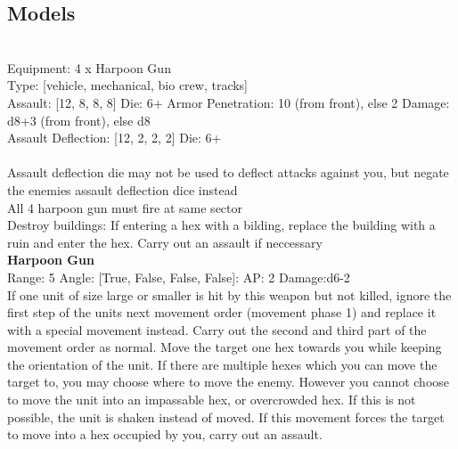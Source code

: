 \subsection{ Models }

 \\
Equipment: 4 x Harpoon Gun \\
Type: [vehicle, mechanical, bio crew, tracks] \\

Assault: [12, 8, 8, 8] Die: 6+ Armor Penetration: 10 (from front), else 2 Damage: d8+3 (from front), else d8 \\
Assault Deflection: [12, 2, 2, 2] Die: 6+\\
\\ 
Assault deflection die may not be used to deflect attacks against you, but negate the enemies assault deflection dice instead\\ 
 

All 4 harpoon gun must fire at same sector\\ 
Destroy buildings: If entering a hex with a bilding, replace the building with a ruin and enter the hex. Carry out an assault if neccessary\\ 


{\bf Harpoon Gun } \\



Range: 5  Angle: [True, False, False, False]: AP: 2 Damage:d6-2 \\
If one unit of size large or smaller is hit by this weapon but not killed, ignore the first step of the units next movement order (movement phase 1) and replace it with a special movement instead. Carry out the second and third part of the movement order as normal. Move the target one hex towards you while keeping the orientation of the unit. If there are multiple hexes which you can move the target to, you may choose where to move the enemy. However you cannot choose to move the unit into an impassable hex, or overcrowded hex. If this is not possible, the unit is shaken instead of moved. If this movement forces the target to move into a hex occupied by you, carry out an assault.\\ 




 





